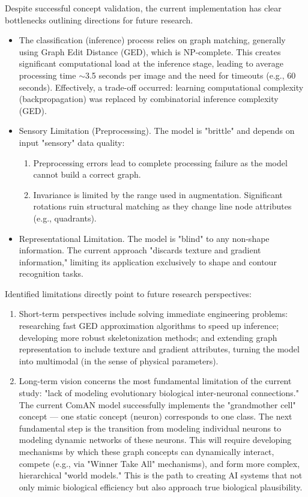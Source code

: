 \documentclass[conference]{IEEEtran}
\begin{document}
Despite successful concept validation, the current implementation has clear bottlenecks outlining directions for future research.
\begin{itemize}
    \item The classification (inference) process relies on graph matching, generally using Graph Edit Distance (GED), which is NP-complete. This creates significant computational load at the inference stage, leading to average processing time $\sim$3.5 seconds per image and the need for timeouts (e.g., 60 seconds). Effectively, a trade-off occurred: learning computational complexity (backpropagation) was replaced by combinatorial inference complexity (GED).
    \item Sensory Limitation (Preprocessing). The model is "brittle" and depends on input "sensory" data quality:
    \begin{enumerate}
        \item Preprocessing errors lead to complete processing failure as the model cannot build a correct graph.
        \item Invariance is limited by the range used in augmentation. Significant rotations ruin structural matching as they change line node attributes (e.g., quadrants).
    \end{enumerate}
    \item Representational Limitation. The model is "blind" to any non-shape information. The current approach "discards texture and gradient information," limiting its application exclusively to shape and contour recognition tasks.
\end{itemize}

Identified limitations directly point to future research perspectives:
\begin{enumerate}
    \item Short-term perspectives include solving immediate engineering problems: researching fast GED approximation algorithms to speed up inference; developing more robust skeletonization methods; and extending graph representation to include texture and gradient attributes, turning the model into multimodal (in the sense of physical parameters).
    \item Long-term vision concerns the most fundamental limitation of the current study: "lack of modeling evolutionary biological inter-neuronal connections." The current ComAN model successfully implements the "grandmother cell" concept — one static concept (neuron) corresponds to one class. The next fundamental step is the transition from modeling individual neurons to modeling dynamic networks of these neurons. This will require developing mechanisms by which these graph concepts can dynamically interact, compete (e.g., via "Winner Take All" mechanisms), and form more complex, hierarchical "world models." This is the path to creating AI systems that not only mimic biological efficiency but also approach true biological plausibility.
\end{enumerate}
\end{document}
